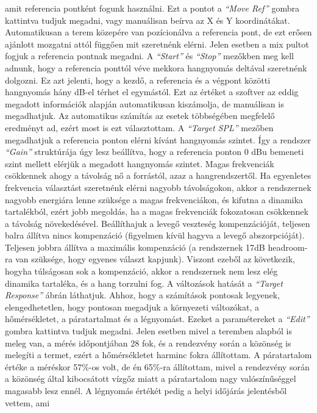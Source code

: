 amit referencia pontként fogunk használni. Ezt a pontot a \textit{``Move Ref''} gombra kattintva tudjuk megadni,
vagy manuálisan beírva az X és Y koordinátákat. Automatikusan a terem közepére van pozícionálva a referencia pont, de
ezt erősen ajánlott mozgatni attól függően mit szeretnénk elérni. Jelen esetben a mix pultot fogjuk a referencia pontnak megadni.
A \textit{``Start''} és \textit{``Stop''} mezőkben meg kell adnunk, hogy a referencia ponttól véve mekkora hangnyomás
deltával szeretnénk dolgozni. Ez azt jelenti, hogy a kezdő, a referencia és a végpont közötti hangnyomás hány dB-el térhet el egymástól.
Ezt az értéket a szoftver az eddig megadott információk alapján automatikusan kiszámolja, de manuálisan is megadhatjuk.
Az automatikus számítás az esetek többségében megfelelő eredményt ad, ezért most is ezt választottam.
A \textit{``Target SPL''} mezőben megadhatjuk a referencia ponton elérni kívánt hangnyomás szintet.
Így a rendszer \textit{``Gain''} struktúrája úgy lesz beállítva, hogy a referencia ponton 0 dBu bemeneti szint mellett elérjük a megadott hangnyomás szintet.
Magas frekvenciák csökkennek ahogy a távolság nő a forrástól, azaz a hangrendszertől.
Ha egyenletes frekvencia választást szeretnénk elérni nagyobb távolságokon, akkor a rendszernek nagyobb energiára lenne szüksége
a magas frekvenciákon, és kifutna a dinamika tartalékból, ezért jobb megoldás, ha a magas frekvenciák fokozatosan csökkennek a távolság növekedésével.
Beállíthajuk a levegő veszteség kompenzációját, teljesen balra állítva nincs kompenzáció (figyelmen kívül hagyva a levegő abszorpcióját).
Teljesen jobbra állítva a maximális kompenzáció (a rendszernek 17dB headroom-ra van szüksége, hogy egyenes választ kapjunk).
Viszont ezeből az következik, hogyha túlságosan sok a kompenzáció, akkor a rendszernek nem lesz elég dinamika tartaléka, és a hang torzulni fog.
A változások hatását a \textit{``Target Response''} ábrán láthatjuk.
Ahhoz, hogy a számítások pontosak legyenek, elengedhetetlen, hogy pontosan megadjuk a környezeti változókat,
a hőmérsékletet, a páratartalmat és a légnyomást. Ezeket a paramétereket a \textit{``Edit''} gombra kattintva tudjuk megadni.
Jelen esetben mivel a teremben alapból is meleg van, a mérés időpontjában 28 fok, és a rendezvény során a közönség is melegíti a termet,
ezért a hőmérsékletet harminc fokra állítottam.
A páratartalom értéke a méréskor 57\%-os volt, de én 65\%-ra állítottam, mivel a rendezvény során a közönség által kibocsátott
vízgőz miatt a páratartalom nagy valószínűséggel magasabb lesz ennél. A légnyomás értékét pedig a helyi időjárás jelentésből vettem, ami
